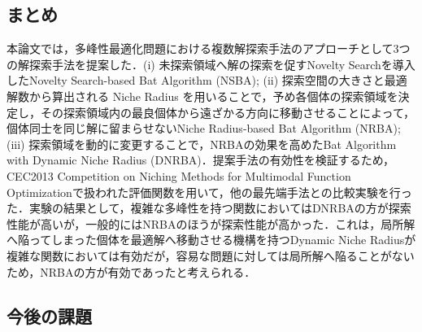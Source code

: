 \documentclass[a4j,11pt]{jarticle}
\begin{document}
\subsection{まとめ}
\label{ss:Conclusion}
本論文では，多峰性最適化問題における複数解探索手法のアプローチとして3つの解探索手法を提案した．(i) 未探索領域へ解の探索を促すNovelty Searchを導入したNovelty Search-based Bat Algorithm (NSBA); (ii) 探索空間の大きさと最適解数から算出される Niche Radius を用いることで，予め各個体の探索領域を決定し，その探索領域内の最良個体から遠ざかる方向に移動させることによって，個体同士を同じ解に留まらせないNiche Radius-based Bat Algorithm (NRBA); (iii) 探索領域を動的に変更することで，NRBAの効果を高めたBat Algorithm with Dynamic Niche Radius (DNRBA)．提案手法の有効性を検証するため，CEC2013 Competition on Niching Methods for Multimodal Function Optimizationで扱われた評価関数を用いて，他の最先端手法との比較実験を行った．実験の結果として，複雑な多峰性を持つ関数においてはDNRBAの方が探索性能が高いが，一般的にはNRBAのほうが探索性能が高かった．これは，局所解へ陥ってしまった個体を最適解へ移動させる機構を持つDynamic Niche Radiusが複雑な関数においては有効だが，容易な問題に対しては局所解へ陥ることがないため，NRBAの方が有効であったと考えられる．



\subsection{今後の課題}
\label{ss:END_future}
\end{document}
